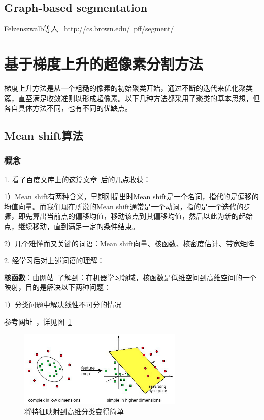 \documentclass[12pt]{article}
\begin{document}
\subsection{Graph-based segmentation}

Felzenszwalb等人~\cite{felzenszwalb2004efficient}
http://cs.brown.edu/~pff/segment/

\section{基于梯度上升的超像素分割方法}

梯度上升方法是从一个粗糙的像素的初始聚类开始，通过不断的迭代来优化聚类簇，直至满足收敛准则以形成超像素。以下几种方法都采用了聚类的基本思想，但各自具体方法不同，也有不同的优缺点。

\subsection{Mean shift算法}

\subsubsection{概念}

1. 看了百度文库上的这篇文章~\cite{MeanShiftIntroduction}后的几点收获：

1）Mean shift有两种含义，早期刚提出时Mean shift是一个名词，指代的是偏移的均值向量。而我们现在所说的Mean shift通常是一个动词，指的是一个迭代的步骤，即先算出当前点的偏移均值，移动该点到其偏移均值，然后以此为新的起始点，继续移动，直到满足一定的条件结束。

2）几个难懂而又关键的词语：Mean shift向量、核函数、核密度估计、带宽矩阵

2. 经学习后对上述词语的理解： 

\textbf{核函数}：由网站~\cite{KernelFunction}了解到：在机器学习领域，核函数是低维空间到高维空间的一个映射，目的是解决以下两种问题：

1）分类问题中解决线性不可分的情况

参考网址~\cite{KernelExample}，详见图~\ref{fig: kernel}

\begin{figure}[!ht]
\centering
\includegraphics[width=0.7\textwidth]{kernel.png}
\caption{将特征映射到高维分类变得简单}
\label{fig: kernel}
\end{figure} 
\end{document}
